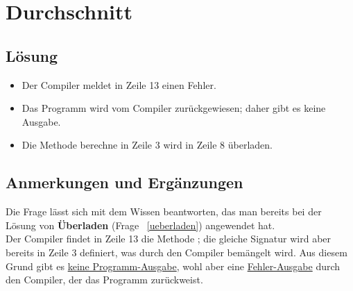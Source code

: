 \chapter{Durchschnitt}

\section*{Lösung}

\begin{itemize}
    \item Der Compiler meldet in Zeile 13 einen Fehler.
    \item Das Programm wird vom Compiler zurückgewiesen; daher gibt es keine Ausgabe.
    \item Die Methode berechne in Zeile 3 wird in Zeile 8 überladen.
\end{itemize}


\section*{Anmerkungen und Ergänzungen}

Die Frage lässt sich mit dem Wissen beantworten, das man bereits bei der Lösung von \textbf{Überladen} (Frage ~\ref{ueberladen}) angewendet hat.\\

Der Compiler findet in Zeile 13 die Methode ; die gleiche Signatur wird aber bereits in Zeile 3
definiert, was durch den Compiler bemängelt wird.
Aus diesem Grund gibt es \underline{keine Programm-Ausgabe}, wohl aber
eine \underline{Fehler-Ausgabe} durch den Compiler, der das Programm zurückweist.

